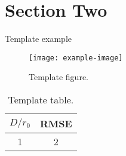 \section{Section Two}
%
\begin{example}{Template example}
    \lipsum[1]
\end{example}
\lipsum[2]

\begin{figure}[htbp]
    \centering
    \texttt{[image: example-image]}
    \caption{Template figure.}
    \label{fig:enter-label}
\end{figure}

\begin{table}[htbp]
    \centering
    \begin{tabular}{c|c}
         $D/r_0$&RMSE  \\
         \hline
         1&2 
    \end{tabular}
    \caption{Template table.}
    \label{tab:placeholder}
\end{table}